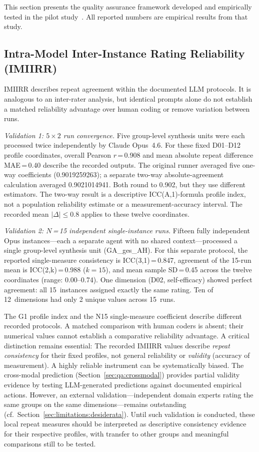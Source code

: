 \documentclass[11pt,a4paper]{article}
\begin{document}
This section presents the quality assurance framework developed and empirically tested in the pilot study~\citep{Geiger2026PaperA}. All reported numbers are empirical results from that study.


\subsection{Intra-Model Inter-Instance Rating Reliability (IMIIRR)}
\label{sec:qa:imiirr}

IMIIRR describes repeat agreement within the documented LLM protocols. It is analogous to an inter-rater analysis, but identical prompts alone do not establish a matched reliability advantage over human coding or remove variation between runs.

\emph{Validation 1: $5 \times 2$ run convergence.} Five group-level synthesis units were each processed twice independently by Claude Opus~4.6. For these fixed D01--D12 profile coordinates, overall Pearson $r$\,=\,0.908 and mean absolute repeat difference MAE\,=\,0.40 describe the recorded outputs. The original runner averaged five one-way coefficients (0.9019259263); a separate two-way absolute-agreement calculation averaged 0.9021014941. Both round to 0.902, but they use different estimators. The two-way result is a descriptive ICC(A,1)-formula profile index, not a population reliability estimate or a measurement-accuracy interval. The recorded mean $|\Delta| \leq 0.8$ applies to these twelve coordinates.

\emph{Validation 2: $N$\,=\,15 independent single-instance runs.} Fifteen fully independent Opus instances---each a separate agent with no shared context---processed a single group-level synthesis unit (GA\_ges\_AH). For this separate protocol, the reported single-measure consistency is ICC(3,1)\,=\,0.847, agreement of the 15-run mean is ICC(2,k)\,=\,0.988 ($k=15$), and mean sample SD\,=\,0.45 across the twelve coordinates (range: 0.00--0.74). One dimension (D02, self-efficacy) showed perfect agreement: all 15~instances assigned exactly the same rating. Ten of 12~dimensions had only 2 unique values across 15~runs.

The G1 profile index and the N15 single-measure coefficient describe different recorded protocols. A matched comparison with human coders is absent; their numerical values cannot establish a comparative reliability advantage. A critical distinction remains essential: The recorded IMIIRR values describe \emph{repeat consistency} for their fixed profiles, not general reliability or \emph{validity} (accuracy of measurement). A highly reliable instrument can be systematically biased. The cross-modal prediction (Section~\ref{sec:qa:crossmodal}) provides partial validity evidence by testing LLM-generated predictions against documented empirical actions. However, an external validation---independent domain experts rating the same groups on the same dimensions---remains outstanding (cf.\ Section~\ref{sec:limitations:desiderata}). Until such validation is conducted, these local repeat measures should be interpreted as descriptive consistency evidence for their respective profiles, with transfer to other groups and meaningful comparisons still to be tested.
\end{document}
